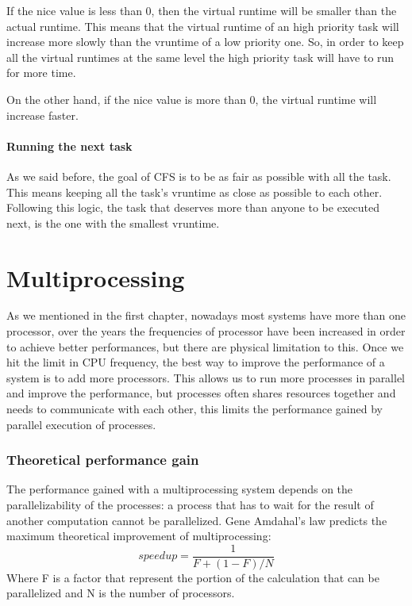 \documentclass[10pt]{book}
\begin{document}
If the nice value is less than 0, then the virtual runtime will be smaller than the actual runtime. This means that the virtual runtime of an high priority task will increase more slowly than the vruntime of a low priority one. So, in order to keep all the virtual runtimes at the same level the high priority task will have to run for more time.

On the other hand, if the nice value is more than 0, the virtual runtime will increase faster.

\paragraph{Running the next task}

As we said before, the goal of CFS is to be as fair as possible with all the task. This means keeping all the task's vruntime as close as possible to each other. Following this logic, the task that deserves more than anyone to be executed next, is the one with the smallest vruntime.

\section{Multiprocessing}

As we mentioned in the first chapter, nowadays most systems have more than one processor, over the years the frequencies of processor have been increased in order to achieve better performances, but there are physical limitation to this. Once we hit the limit in CPU frequency, the best way to improve the performance of a system is to add more processors. This allows us to run more processes in parallel and improve the performance, but processes often shares resources together and needs to communicate with each other, this limits the performance gained by parallel execution of processes.

\subsubsection{Theoretical performance gain}
The performance gained with a multiprocessing system depends on the parallelizability of the processes: a process that has to wait for the result of another computation cannot be parallelized. Gene Amdahal's law predicts the maximum theoretical improvement of multiprocessing:
\begin{equation}
    speedup = \frac{1}{F + (1-F)/N}
\end{equation}
Where F is a factor that represent the portion of the calculation that can be parallelized and N is the number of processors.
\end{document}
